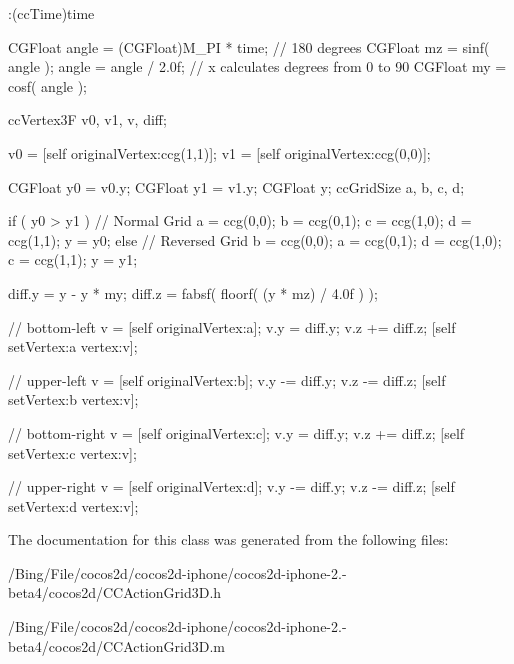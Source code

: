 \begin{DoxyCode}
             :(ccTime)time
{
        CGFloat angle = (CGFloat)M_PI * time; // 180 degrees
        CGFloat mz = sinf( angle );
        angle = angle / 2.0f;     // x calculates degrees from 0 to 90
        CGFloat my = cosf( angle );

        ccVertex3F      v0, v1, v, diff;

        v0 = [self originalVertex:ccg(1,1)];
        v1 = [self originalVertex:ccg(0,0)];

        CGFloat y0 = v0.y;
        CGFloat y1 = v1.y;
        CGFloat y;
        ccGridSize      a, b, c, d;

        if ( y0 > y1 )
        {
                // Normal Grid
                a = ccg(0,0);
                b = ccg(0,1);
                c = ccg(1,0);
                d = ccg(1,1);
                y = y0;
        }
        else
        {
                // Reversed Grid
                b = ccg(0,0);
                a = ccg(0,1);
                d = ccg(1,0);
                c = ccg(1,1);
                y = y1;
        }

        diff.y = y - y * my;
        diff.z = fabsf( floorf( (y * mz) / 4.0f ) );

        // bottom-left
        v = [self originalVertex:a];
        v.y = diff.y;
        v.z += diff.z;
        [self setVertex:a vertex:v];

        // upper-left
        v = [self originalVertex:b];
        v.y -= diff.y;
        v.z -= diff.z;
        [self setVertex:b vertex:v];

        // bottom-right
        v = [self originalVertex:c];
        v.y = diff.y;
        v.z += diff.z;
        [self setVertex:c vertex:v];

        // upper-right
        v = [self originalVertex:d];
        v.y -= diff.y;
        v.z -= diff.z;
        [self setVertex:d vertex:v];
}
\end{DoxyCode}


The documentation for this class was generated from the following files\-:\begin{DoxyCompactItemize}
\item 
/\-Bing/\-File/cocos2d/cocos2d-\/iphone/cocos2d-\/iphone-\/2.-\/beta4/cocos2d/C\-C\-Action\-Grid3\-D.\-h\item 
/\-Bing/\-File/cocos2d/cocos2d-\/iphone/cocos2d-\/iphone-\/2.-\/beta4/cocos2d/C\-C\-Action\-Grid3\-D.\-m\end{DoxyCompactItemize}
